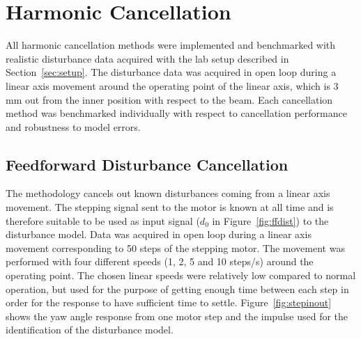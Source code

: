 \newpage
\FloatBarrier
\section{Harmonic Cancellation}
All harmonic cancellation methods were implemented and benchmarked with realistic disturbance data acquired with the lab setup described in Section~\ref{sec:setup}. The disturbance data was acquired in open loop during a linear axis movement around the operating point of the linear axis, which is 3 mm out from the inner position with respect to the beam. Each cancellation method was benchmarked individually with respect to cancellation performance and robustness to model errors.

\subsection{Feedforward Disturbance Cancellation}\label{sec:hc}
The \abbrFDC methodology cancels out known disturbances coming from a linear axis movement. The stepping signal sent to the motor is known at all time and is therefore suitable to be used as input signal ($d_0$ in Figure~\ref{fig:ffdist}) to the disturbance model. Data was acquired in open loop during a linear axis movement corresponding to 50 steps of the stepping motor. The movement was performed with four different speeds (1, 2, 5 and 10 steps/s) around the operating point. The chosen linear speeds were relatively low compared to normal operation, but used for the purpose of getting enough time between each step in order for the response to have sufficient time to settle. Figure~\ref{fig:stepinout} shows the yaw angle response from one motor step and the impulse used for the identification of the disturbance model.

